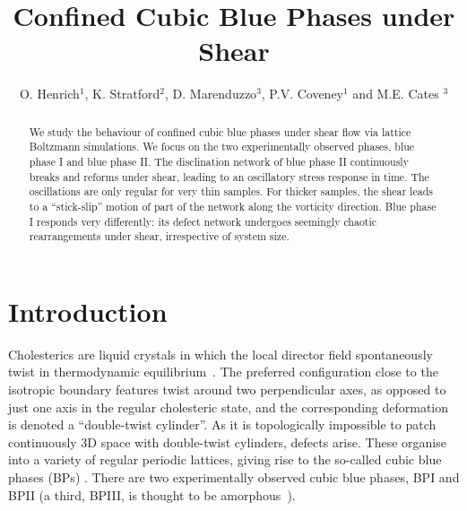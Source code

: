 \documentclass[12pt,twoside]{iopart}
\begin{document}
\title[]{Confined Cubic Blue Phases under Shear}
\author{O. Henrich$^{1}$, K. Stratford$^2$, D. Marenduzzo$^3$, P.V. Coveney$^1$ and M.E. Cates $^3$}

\address{$^1$ Centre for Computational Science, University College London, UK\\$^2$ Edinburgh Parallel Computing Centre, The University of Edinburgh, UK\\$^3$ School of Physics and Astronomy, The University of Edinburgh, UK}

\begin{abstract}
We study the behaviour of confined cubic blue phases under shear flow
via lattice Boltzmann simulations. We focus on the two experimentally observed
phases, blue phase I and blue phase II. The disclination network of blue phase II continuously breaks and reforms under shear, 
leading to an oscillatory stress response in time. The oscillations are only regular for very thin samples. For thicker samples, the shear leads to a ``stick-slip'' motion
of part of the network along the vorticity direction.
Blue phase I responds very differently: its defect network undergoes seemingly
chaotic rearrangements under shear, irrespective of system size. 
\end{abstract}


\section{Introduction}
Cholesterics are liquid crystals in which the local director field spontaneously twist in thermodynamic equilibrium~\cite{deGennes}.
The preferred configuration close to the isotropic boundary features twist around two perpendicular axes, as opposed to just one axis in the regular cholesteric state, and the corresponding deformation is denoted a ``double-twist cylinder''.
As it is topologically impossible to patch continuously 3D space with double-twist cylinders, defects arise. These organise into a variety of regular periodic lattices, giving rise to the so-called cubic blue phases (BPs) \cite{Grebel:1984,Wright:1989}. There are two experimentally observed cubic blue phases, BPI and BPII (a third, BPIII, is thought to be amorphous~\cite{Henrich:2011a}).
\end{document}

